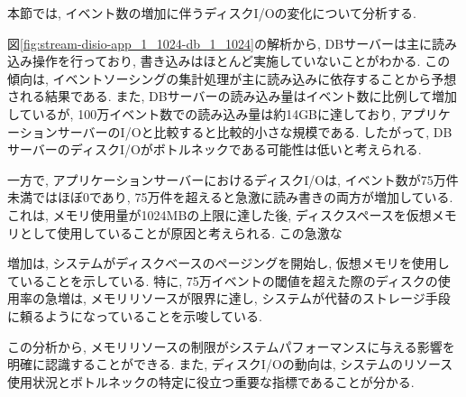 \documentclass[../../../../../main]{subfiles}
\begin{document}
    \label{subsubsubsec:result-streaming-only-limit-diskio}

    本節では, イベント数の増加に伴うディスクI/Oの変化について分析する.

    

    図\ref{fig:stream-disio-app_1_1024-db_1_1024}の解析から, DBサーバーは主に読み込み操作を行っており, 書き込みはほとんど実施していないことがわかる. この傾向は, イベントソーシングの集計処理が主に読み込みに依存することから予想される結果である. また, DBサーバーの読み込み量はイベント数に比例して増加しているが, 100万イベント数での読み込み量は約14GBに達しており, アプリケーションサーバーのI/Oと比較すると比較的小さな規模である. したがって, DBサーバーのディスクI/Oがボトルネックである可能性は低いと考えられる.

    一方で, アプリケーションサーバーにおけるディスクI/Oは, イベント数が75万件未満ではほぼ0であり, 75万件を超えると急激に読み書きの両方が増加している. これは, メモリ使用量が1024MBの上限に達した後, ディスクスペースを仮想メモリとして使用していることが原因と考えられる. この急激な

    増加は, システムがディスクベースのページングを開始し, 仮想メモリを使用していることを示している. 特に, 75万イベントの閾値を超えた際のディスクの使用率の急増は, メモリリソースが限界に達し, システムが代替のストレージ手段に頼るようになっていることを示唆している.

    この分析から, メモリリソースの制限がシステムパフォーマンスに与える影響を明確に認識することができる. また, ディスクI/Oの動向は, システムのリソース使用状況とボトルネックの特定に役立つ重要な指標であることが分かる.
\end{document}
